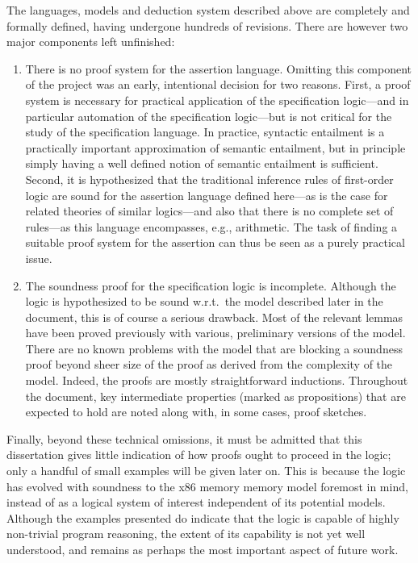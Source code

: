 \documentclass[11pt]{report}         %
\begin{document}
The languages, models and deduction system described above are completely and formally defined, having undergone hundreds of revisions. There are however two major components left unfinished: 
\begin{enumerate}
  \item There is no proof system for the assertion language. Omitting this component of the project was an early, intentional decision for two reasons. First, a proof system is necessary for practical application of the specification logic---and in particular automation of the specification logic---but is not critical for the study of the specification language. In practice, syntactic entailment is a practically important approximation of semantic entailment, but in principle simply having a well defined notion of semantic entailment is sufficient. Second, it is hypothesized that the traditional inference rules of first-order logic are sound for the assertion language defined here---as is the case for related theories of similar logics---and also that there is no complete set of rules---as this language encompasses, e.g., arithmetic. The task of finding a suitable proof system for the assertion can thus be seen as a purely practical issue.

  \item The soundness proof for the specification logic is incomplete. Although the logic is hypothesized to be sound w.r.t.\ the model described later in the document, this is of course a serious drawback. Most of the relevant lemmas have been proved previously with various, preliminary versions of the model. There are no known problems with the model that are blocking a soundness proof beyond sheer size of the proof as derived from the complexity of the model. Indeed, the proofs are mostly straightforward inductions. Throughout the document, key intermediate properties (marked as propositions) that are expected to hold are noted along with, in some cases, proof sketches. 
\end{enumerate}

Finally, beyond these technical omissions, it must be admitted that this dissertation gives little indication of how proofs ought to proceed in the logic; only a handful of small examples will be given later on. This is because the logic has evolved with soundness to the x86 memory memory model foremost in mind, instead of as a logical system of interest independent of its potential models. Although the examples presented do indicate that the logic is capable of highly non-trivial program reasoning, the extent of its capability is not yet well understood, and remains as perhaps the most important aspect of future work. 
\end{document}
